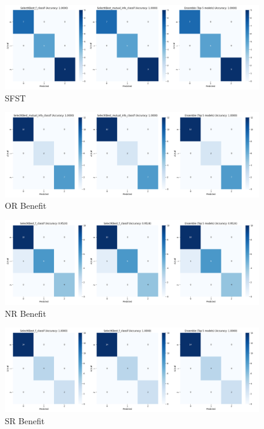 \begin{figure}
    \centering
    \includegraphics[width=0.75\linewidth]{class_all_section/images_class_ensemble_reduction/confusion_matrices_SFST.png}
    \caption{SFST}
    \label{fig:sfst_class_ensemble_reduction}
\end{figure}




\begin{figure}
    \centering
    \includegraphics[width=0.75\linewidth]{class_all_section/images_class_ensemble_reduction/confusion_matrices_PR_Benefit.png}
    \caption{OR Benefit}
    \label{fig:pr_ben_class_ensemble_reduction}
\end{figure}

\begin{figure}
    \centering
    \includegraphics[width=0.75\linewidth]{class_all_section/images_class_ensemble_reduction/confusion_matrices_NR_Benefit.png}
    \caption{NR Benefit}
    \label{fig:nr_ben_class_ensemble_reduction}
\end{figure}

\begin{figure}
    \centering
    \includegraphics[width=0.75\linewidth]{class_all_section/images_class_ensemble_reduction/confusion_matrices_SR_Benefit.png}
    \caption{SR Benefit}
    \label{fig:sr_ben_class_ensemble_reduction}
\end{figure}

